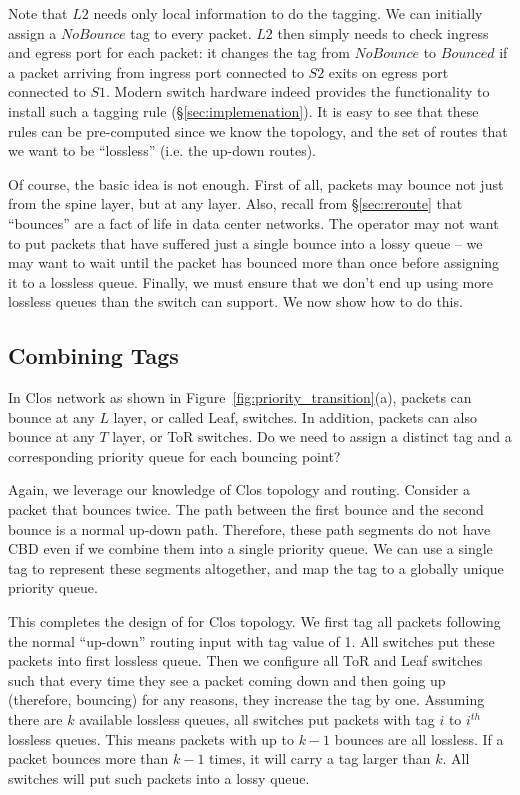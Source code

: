 Note that $L2$ needs only local information to do the tagging. We can initially
assign a $NoBounce$ tag to every packet. $L2$ then simply needs to check ingress
and egress port for each packet: it changes the tag from $NoBounce$ to $Bounced$
if a packet arriving from ingress port connected to $S2$ exits on egress port
connected to $S1$.  Modern switch hardware indeed provides the functionality to
install such a tagging rule (\S\ref{sec:implemenation}).  It is easy to see that
these rules can be pre-computed since we know the topology, and the set of
routes that we want to be ``lossless'' (i.e. the up-down routes). 

Of course, the basic idea is not enough. First of all, packets may bounce not
just from the spine layer, but at any layer. Also, recall from
\S\ref{sec:reroute} that ``bounces'' are a fact of life in data center networks.
The operator may not want to put packets that have suffered just a single bounce
into a lossy queue -- we may want to wait until the packet has bounced more than
once before assigning it to a lossless queue. Finally, we must ensure that we don't
end up using more lossless queues than the switch can support. We now show how
to do this.

\subsection{Combining Tags}
\label{subsec:combine}

In Clos network as shown in Figure~\ref{fig:priority_transition}(a), packets can
bounce at any $L$ layer, or called Leaf, switches. In addition, packets can also
bounce at any $T$ layer, or ToR switches. Do we need to assign a distinct tag
and a corresponding priority queue for each bouncing point? 

Again, we leverage our knowledge of Clos topology and routing. Consider a packet
that bounces twice. The path between the first bounce and the second bounce is a
normal up-down path. Therefore, these path segments do not have CBD even if we
combine them into a single priority queue. We can use a single tag to represent
these segments altogether, and map the tag to a globally unique priority queue.

This completes the design of \sysname{} for Clos topology.  We first tag all
packets following the normal ``up-down'' routing input with tag value of 1. All
switches put these packets into first lossless queue. Then we configure all ToR
and Leaf switches such that every time they see a packet coming down and then
going up (therefore, bouncing) for any reasons, they increase the tag by one.
Assuming there are $k$ available lossless queues, all switches put packets with
tag $i$ to $i^{th}$ lossless queues. This means packets with up to $k-1$ bounces
are all lossless. If a packet bounces more than $k-1$ times, it will carry a tag
larger than $k$. All switches will put such packets into a lossy queue.

